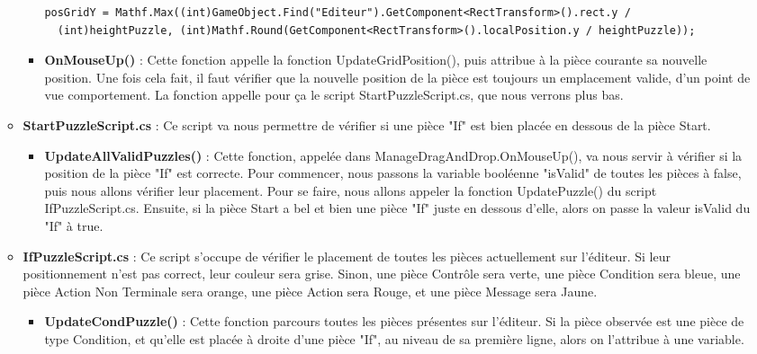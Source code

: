 \documentclass{report}
\begin{document}
\begin{enumerate}[label=\Alph*)]
\begin{itemize}
\begin{itemize}
\begin{lstlisting}[frame=single]
posGridY = Mathf.Max((int)GameObject.Find("Editeur").GetComponent<RectTransform>().rect.y / 
  (int)heightPuzzle, (int)Mathf.Round(GetComponent<RectTransform>().localPosition.y / heightPuzzle));
\end{lstlisting}
\item\textbf{OnMouseUp()} : \newline
Cette fonction appelle la fonction UpdateGridPosition(), puis attribue à la pièce courante sa nouvelle position. Une fois cela fait, il faut vérifier que la nouvelle position de la pièce est toujours un emplacement valide, d'un point de vue comportement. La fonction appelle pour ça le script StartPuzzleScript.cs, que nous verrons plus bas.
\end{itemize}
\item\textbf{StartPuzzleScript.cs} : \newline
Ce script va nous permettre de vérifier si une pièce "If" est bien placée en dessous de la pièce Start.

\begin{itemize}
\item\textbf{UpdateAllValidPuzzles()} : \newline
Cette fonction, appelée dans ManageDragAndDrop.OnMouseUp(), va nous servir à vérifier si la position de la pièce "If" est correcte. Pour commencer, nous passons la variable booléenne "isValid" de toutes les pièces à false, puis nous allons vérifier leur placement.\newline
Pour se faire, nous allons appeler la fonction UpdatePuzzle() du script IfPuzzleScript.cs.\newline
Ensuite, si la pièce Start a bel et bien une pièce "If" juste en dessous d'elle, alors on passe la valeur isValid du "If" à true.
\end{itemize}

\item\textbf{IfPuzzleScript.cs} : \newline
Ce script s'occupe de vérifier le placement de toutes les pièces actuellement sur l'éditeur. Si leur positionnement n'est pas correct, leur couleur sera grise. Sinon, une pièce Contrôle sera verte, une pièce Condition sera bleue, une pièce Action Non Terminale sera orange, une pièce Action sera Rouge, et une pièce Message sera Jaune.
\begin{itemize}
\item\textbf{UpdateCondPuzzle()} : \newline
Cette fonction parcours toutes les pièces présentes sur l'éditeur. Si la pièce observée est une pièce de type Condition, et qu'elle est placée à droite d'une pièce "If", au niveau de sa première ligne, alors on l'attribue à une variable.


\end{itemize}
\end{itemize}
\end{enumerate}
\end{document}
